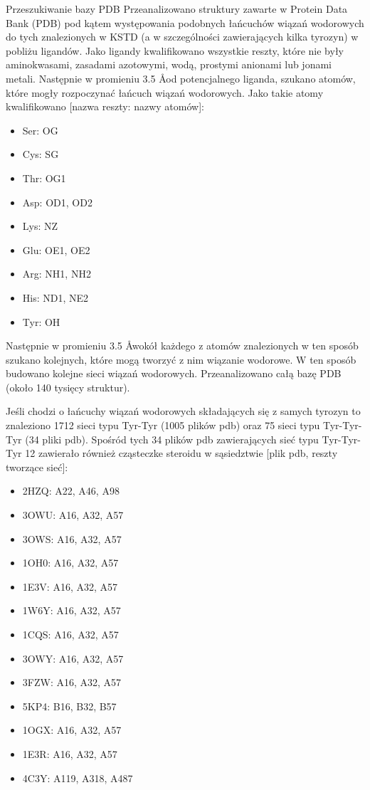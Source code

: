 \documentclass[10pt,a4paper]{article}
\newcommand{\angstrom}{\mbox{\normalfont\AA}}
\begin{document}
\begin{section}{Przeszukiwanie bazy PDB}
 Przeanalizowano struktury zawarte w Protein Data Bank (PDB) pod kątem występowania podobnych łańcuchów wiązań wodorowych do tych znalezionych w KSTD (a w szczególności zawierających kilka tyrozyn) w pobliżu
 ligandów. Jako ligandy kwalifikowano wszystkie reszty, które nie były aminokwasami, zasadami azotowymi, wodą, prostymi anionami lub jonami metali. Następnie w promieniu 3.5 \angstrom od potencjalnego liganda,
 szukano atomów, które mogły rozpoczynać łańcuch wiązań wodorowych. Jako takie atomy kwalifikowano [nazwa reszty: nazwy atomów]:
 \begin{itemize}
  \item Ser: OG
  \item Cys: SG
  \item Thr: OG1
  \item Asp: OD1, OD2
  \item Lys: NZ
  \item Glu: OE1, OE2
  \item Arg: NH1, NH2
  \item His: ND1, NE2
  \item Tyr: OH
 \end{itemize}

 Następnie w promieniu 3.5 \angstrom wokół każdego z atomów znalezionych w ten sposób szukano kolejnych, które mogą tworzyć z nim wiązanie wodorowe. W ten sposób budowano kolejne sieci wiązań wodorowych.
 Przeanalizowano całą bazę PDB (około 140 tysięcy struktur).
 
 Jeśli chodzi o łańcuchy wiązań wodorowych składających się z samych tyrozyn to znaleziono 1712 sieci typu Tyr-Tyr (1005 plików pdb) oraz 75 sieci typu Tyr-Tyr-Tyr (34 pliki pdb).
 Spośród tych 34 plików pdb zawierających sieć typu Tyr-Tyr-Tyr 12 zawierało również cząsteczke steroidu w sąsiedztwie [plik pdb, reszty tworzące sieć]:
 \begin{itemize}
  \item 2HZQ: A22, A46, A98
  \item 3OWU: A16, A32, A57
  \item 3OWS: A16, A32, A57
  \item 1OH0: A16, A32, A57
  \item 1E3V: A16, A32, A57
  \item 1W6Y: A16, A32, A57
  \item 1CQS: A16, A32, A57
  \item 3OWY: A16, A32, A57
  \item 3FZW: A16, A32, A57
  \item 5KP4: B16, B32, B57
  \item 1OGX: A16, A32, A57
  \item 1E3R: A16, A32, A57
  \item 4C3Y: A119, A318, A487
 \end{itemize}


\end{section}
\end{document}
